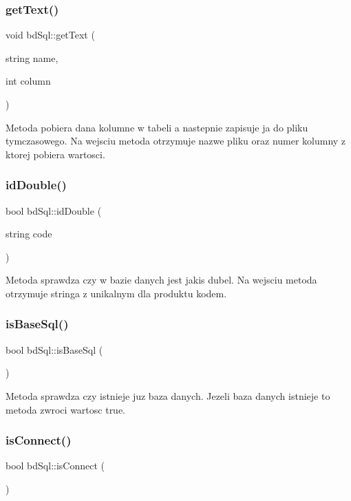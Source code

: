 \subsubsection{\texorpdfstring{get\+Text()}{getText()}}
{\footnotesize\ttfamily void bd\+Sql\+::get\+Text (\begin{DoxyParamCaption}\item[{string}]{name,  }\item[{int}]{column }\end{DoxyParamCaption})}

Metoda pobiera dana kolumne w tabeli a nastepnie zapisuje ja do pliku tymczasowego. Na wejsciu metoda otrzymuje nazwe pliku oraz numer kolumny z ktorej pobiera wartosci. \mbox{\label{classbd_sql_a6e9a3dd4c88f9b7173578d4e89a9c882}} 
\subsubsection{\texorpdfstring{id\+Double()}{idDouble()}}
{\footnotesize\ttfamily bool bd\+Sql\+::id\+Double (\begin{DoxyParamCaption}\item[{string}]{code }\end{DoxyParamCaption})}

Metoda sprawdza czy w bazie danych jest jakis dubel. Na wejsciu metoda otrzymuje stringa z unikalnym dla produktu kodem. \mbox{\label{classbd_sql_a0b7a0441d1a99d70f6511eb0d8022399}} 
\subsubsection{\texorpdfstring{is\+Base\+Sql()}{isBaseSql()}}
{\footnotesize\ttfamily bool bd\+Sql\+::is\+Base\+Sql (\begin{DoxyParamCaption}{ }\end{DoxyParamCaption})}

Metoda sprawdza czy istnieje juz baza danych. Jezeli baza danych istnieje to metoda zwroci wartosc true. \mbox{\label{classbd_sql_a18c28038b8b6171287e045b5bf5afd65}} 
\subsubsection{\texorpdfstring{is\+Connect()}{isConnect()}}
{\footnotesize\ttfamily bool bd\+Sql\+::is\+Connect (\begin{DoxyParamCaption}{ }\end{DoxyParamCaption})}

